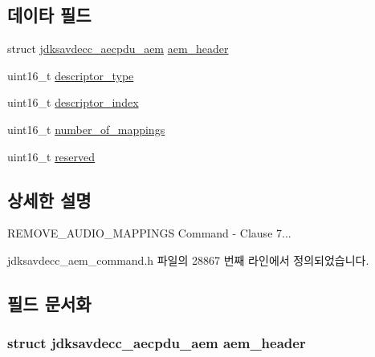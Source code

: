\subsection*{데이타 필드}
\begin{DoxyCompactItemize}
\item 
struct \hyperlink{structjdksavdecc__aecpdu__aem}{jdksavdecc\+\_\+aecpdu\+\_\+aem} \hyperlink{structjdksavdecc__aem__command__remove__audio__mappings_ae1e77ccb75ff5021ad923221eab38294}{aem\+\_\+header}
\item 
uint16\+\_\+t \hyperlink{structjdksavdecc__aem__command__remove__audio__mappings_ab7c32b6c7131c13d4ea3b7ee2f09b78d}{descriptor\+\_\+type}
\item 
uint16\+\_\+t \hyperlink{structjdksavdecc__aem__command__remove__audio__mappings_a042bbc76d835b82d27c1932431ee38d4}{descriptor\+\_\+index}
\item 
uint16\+\_\+t \hyperlink{structjdksavdecc__aem__command__remove__audio__mappings_ac7db472c5622ef473d5d0a5c416d5531}{number\+\_\+of\+\_\+mappings}
\item 
uint16\+\_\+t \hyperlink{structjdksavdecc__aem__command__remove__audio__mappings_a5a6ed8c04a3db86066924b1a1bf4dad3}{reserved}
\end{DoxyCompactItemize}


\subsection{상세한 설명}
R\+E\+M\+O\+V\+E\+\_\+\+A\+U\+D\+I\+O\+\_\+\+M\+A\+P\+P\+I\+N\+GS Command -\/ Clause 7... 

jdksavdecc\+\_\+aem\+\_\+command.\+h 파일의 28867 번째 라인에서 정의되었습니다.



\subsection{필드 문서화}
\subsubsection[{\texorpdfstring{aem\+\_\+header}{aem_header}}]{\setlength{\rightskip}{0pt plus 5cm}struct {\bf jdksavdecc\+\_\+aecpdu\+\_\+aem} aem\+\_\+header}\hypertarget{structjdksavdecc__aem__command__remove__audio__mappings_ae1e77ccb75ff5021ad923221eab38294}{}\label{structjdksavdecc__aem__command__remove__audio__mappings_ae1e77ccb75ff5021ad923221eab38294}



